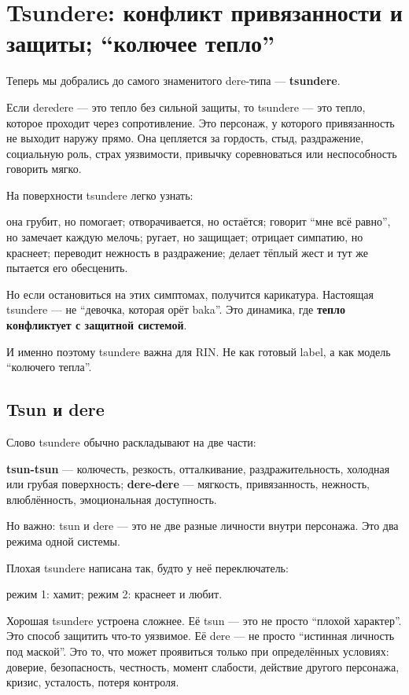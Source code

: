 \section{Tsundere: конфликт привязанности и защиты; “колючее тепло”}

Теперь мы добрались до самого знаменитого dere-типа ---
\textbf{tsundere}.

Если deredere --- это тепло без сильной защиты, то tsundere --- это
тепло, которое проходит через сопротивление. Это персонаж, у которого
привязанность не выходит наружу прямо. Она цепляется за гордость, стыд,
раздражение, социальную роль, страх уязвимости, привычку соревноваться
или неспособность говорить мягко.

На поверхности tsundere легко узнать:

она грубит, но помогает; отворачивается, но остаётся; говорит ``мне всё
равно'', но замечает каждую мелочь; ругает, но защищает; отрицает
симпатию, но краснеет; переводит нежность в раздражение; делает тёплый
жест и тут же пытается его обесценить.

Но если остановиться на этих симптомах, получится карикатура. Настоящая
tsundere --- не ``девочка, которая орёт baka''. Это динамика, где
\textbf{тепло конфликтует с защитной системой}.

И именно поэтому tsundere важна для RIN. Не как готовый label, а как
модель ``колючего тепла''.

\subsection*{Tsun и dere}

Слово tsundere обычно раскладывают на две части:

\textbf{tsun-tsun} --- колючесть, резкость, отталкивание,
раздражительность, холодная или грубая поверхность; \textbf{dere-dere}
--- мягкость, привязанность, нежность, влюблённость, эмоциональная
доступность.

Но важно: tsun и dere --- это не две разные личности внутри персонажа.
Это два режима одной системы.

Плохая tsundere написана так, будто у неё переключатель:

режим 1: хамит; режим 2: краснеет и любит.

Хорошая tsundere устроена сложнее. Её tsun --- это не просто ``плохой
характер''. Это способ защитить что-то уязвимое. Её dere --- не просто
``истинная личность под маской''. Это то, что может проявиться только
при определённых условиях: доверие, безопасность, честность, момент
слабости, действие другого персонажа, кризис, усталость, потеря
контроля.

